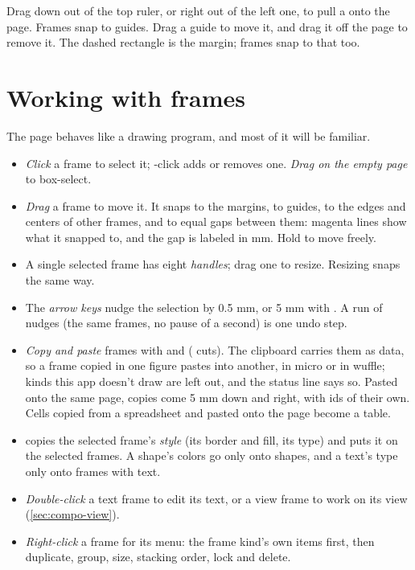 Drag down out of the top ruler, or right out of the left one, to pull a  onto the page. Frames snap to guides. Drag a guide to move it, and drag it off the page to remove it. The dashed rectangle is the margin; frames snap to that too.

\section{Working with frames}\label{sec:compo-frames}

The page behaves like a drawing program, and most of it will be familiar.

\begin{itemize}
\item \emph{Click} a frame to select it; -click adds or removes one. \emph{Drag on the empty page} to box-select.
\item \emph{Drag} a frame to move it. It snaps to the margins, to guides, to the edges and centers of other frames, and to equal gaps between them: magenta lines show what it snapped to, and the gap is labeled in mm. Hold  to move freely.
\item A single selected frame has eight \emph{handles}; drag one to resize. Resizing snaps the same way.
\item The \emph{arrow keys} nudge the selection by 0.5 mm, or 5 mm with . A run of nudges (the same frames, no pause of a second) is one undo step.
\item \emph{Copy and paste} frames with  and  ( cuts). The clipboard carries them as data, so a frame copied in one figure pastes into another, in micro or in wuffle; kinds this app doesn't draw are left out, and the status line says so. Pasted onto the same page, copies come 5 mm down and right, with ids of their own. Cells copied from a spreadsheet and pasted onto the page become a table.
\item {} copies the selected frame's \emph{style} (its border and fill, its type) and  puts it on the selected frames. A shape's colors go only onto shapes, and a text's type only onto frames with text.
\item \emph{Double-click} a text frame to edit its text, or a view frame to work on its view (\cref{sec:compo-view}).
\item \emph{Right-click} a frame for its menu: the frame kind's own items first, then duplicate, group, size, stacking order, lock and delete.
\end{itemize}

